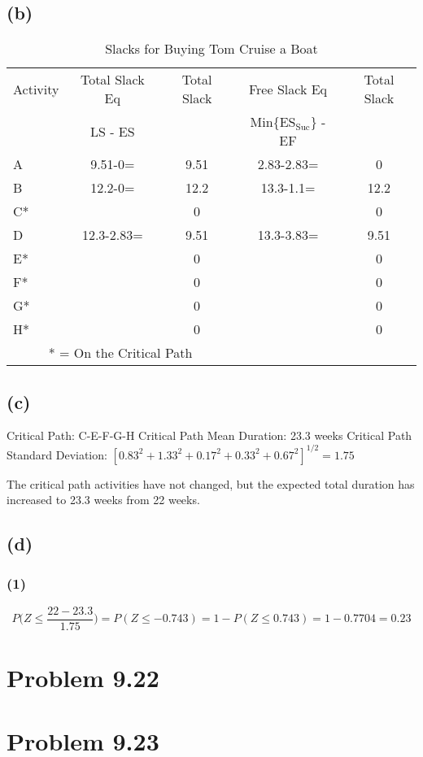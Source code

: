 \documentclass{article}
\begin{document}
	\begin{center}
	\makebox[\textwidth]{
		}
	\end{center}
	\subsection*{(b)}
	{\renewcommand{\arraystretch}{1.2} 
	\begin{table}[h!tbp]
  		\begin{center}
    		\caption{Slacks for Buying Tom Cruise a Boat}
    		\label{tab:table2}
			
    		\begin{tabular}{lcccc}
				Activity & Total Slack Eq & Total Slack & Free Slack Eq & Total Slack\\
				& LS - ES & & Min\{ES$_{\text{Suc}}$\} - EF & \\
				\hline
      			A & 9.51-0= & 9.51 & 2.83-2.83=& 0\\
      			B & 12.2-0= & 12.2 & 13.3-1.1= & 12.2\\
				C* && 0 && 0\\
				D & 12.3-2.83= & 9.51 & 13.3-3.83= & 9.51\\
				E* && 0 && 0\\
				F* && 0 && 0\\
				G* && 0 && 0\\
				H* && 0 && 0\\
				\hline
				\multicolumn{3}{c}{* = On the Critical Path}\\
    		\end{tabular}
  		\end{center}
	\end{table}
	}
	\subsection*{(c)}
	\noindent Critical Path: C-E-F-G-H\newline
	Critical Path Mean Duration: 23.3 weeks\newline
	Critical Path Standard Deviation: $[0.83^2 + 1.33^2 + 0.17^2 + 0.33^2 + 0.67^2]^{1/2} = 1.75$
	\newline
	
	\noindent The critical path activities have not changed, but the expected total duration has increased to 23.3 weeks from 22 weeks. 
	\subsection*{(d)}
	
	\subsubsection*{(1)}
	\begin{equation}
		P\bigg(Z\le \frac{22-23.3}{1.75}\bigg) = P(Z \le -0.743) = 1 - P(Z \le 0.743) = 1 - 0.7704 = 0.23
	\end{equation}
	\section*{Problem 9.22}
	
	\section*{Problem 9.23}
	
\end{document}

